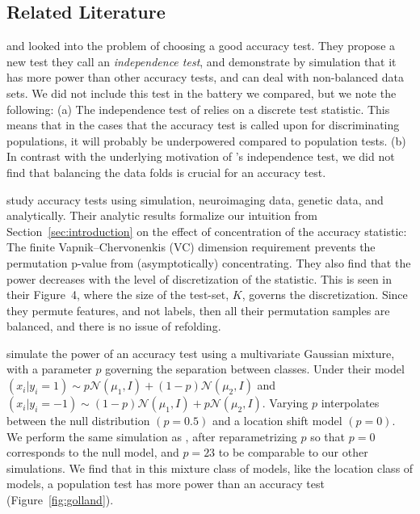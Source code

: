 \documentclass[12pt,a4paper]{article}
\theoremstyle{definition}
\newcommand{\gauss}[1]{\mathcal{N}\left(#1\right)} %
\begin{document}
\subsection{Related Literature}
\cite{olivetti_induction_2012} and \cite{olivetti_statistical_2014} looked into the problem of choosing a good accuracy test. 
They propose a new test they call an \emph{independence test}, and demonstrate by simulation that it has more power than other accuracy tests, and can deal with non-balanced data sets. 
We did not include this test in the battery we compared, but we note the following: 
(a) The independence test of \cite{olivetti_induction_2012} relies on a discrete test statistic. This means that in the cases that the accuracy test is called upon for discriminating populations, it will probably be underpowered compared to population tests. 
(b) In contrast with the underlying motivation of \cite{olivetti_induction_2012}'s independence test, we did not find that balancing the data folds is crucial for an accuracy test. 

\cite{golland_permutation_2005} study accuracy tests using simulation, neuroimaging data, genetic data, and analytically.
Their analytic results formalize our intuition from Section~\ref{sec:introduction} on the effect of concentration of the accuracy statistic:
The finite Vapnik–Chervonenkis (VC) dimension requirement \citep[Sec 4.3]{golland_permutation_2003} prevents the permutation p-value from (asymptotically) concentrating. 
They also find that the power decreases with the level of discretization of the statistic. 
This is seen in their Figure~4, where the size of the test-set, $K$, governs the discretization. 
Since they permute features, and not labels, then all their permutation samples are balanced, and there is no issue of refolding. 

\cite{golland_permutation_2005} simulate the power of an accuracy test using a multivariate Gaussian mixture, with a parameter $p$ governing the separation between classes. 
Under their model 
$(x_i|y_i=1) \sim p \gauss{\mu_1,I}+ (1-p) \gauss{\mu_2,I}$ 
and 
$(x_i|y_i=-1) \sim (1-p) \gauss{\mu_1,I}+ p \gauss{\mu_2,I}$.
Varying $p$ interpolates between the null distribution $(p=0.5)$ and a location shift model $(p=0)$. 
We perform the same simulation as \cite{golland_permutation_2005}, after reparametrizing $p$ so that $p=0$ corresponds to the null model, and $p=23$ to be comparable to our other simulations.
We find that in this mixture class of models, like the location class of models, a population test has more power than an accuracy test (Figure~\ref{fig:golland}).
\end{document}
